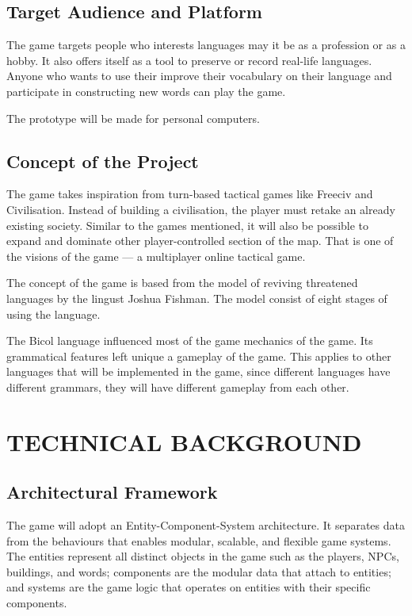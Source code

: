 \documentclass[11pt]{article}
\begin{document}
\subsection{Target Audience and Platform}
The game targets people who interests languages may it be as a profession or as a hobby. It also offers itself as a tool to preserve or record real-life languages. Anyone who wants to use their improve their vocabulary on their language and participate in constructing new words can play the game.

The prototype will be made for personal computers.

\subsection{Concept of the Project}
The game takes inspiration from turn-based tactical games like Freeciv and Civilisation. Instead of building a civilisation, the player must retake an already existing society. Similar to the games mentioned, it will also be possible to expand and dominate other player-controlled section of the map. That is one of the visions of the game --- a multiplayer online tactical game.

The concept of the game is based from the model of reviving threatened languages by the lingust Joshua Fishman. The model consist of eight stages of using the language.

The Bicol language influenced most of the game mechanics of the game. Its grammatical features left unique a gameplay of the game. This applies to other languages that will be implemented in the game, since different languages have different grammars, they will have different gameplay from each other.

\section{TECHNICAL BACKGROUND}
\subsection{Architectural Framework}
The game will adopt an Entity-Component-System architecture. It separates data from the behaviours that enables modular, scalable, and flexible game systems. The entities represent all distinct objects in the game such as the players, NPCs, buildings, and words; components are the modular data that attach to entities; and systems are the game logic that operates on entities with their specific components.
\end{document}
